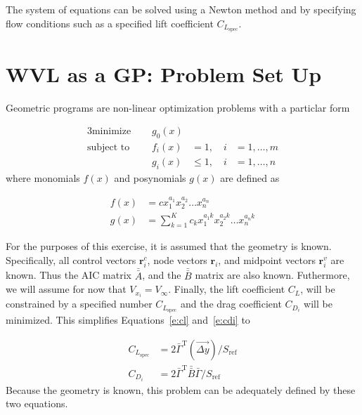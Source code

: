 \documentclass[10pt, a4paper]{article}
\begin{document}
The system of equations can be solved using a Newton method and by specifying flow conditions such as a specified lift coefficient $C_{L_{\mathrm{spec}}}$.


\section{WVL as a GP: Problem Set Up}

Geometric programs are non-linear optimization problems with a particlar form

\begin{alignat*}{3}
    \text{minimize }\quad & g_0 (x) && \\
    \text{subject to }\quad & f_i(x) &= 1,\quad  i&=1,\dots,m \\
                            & g_i(x) &\leq 1, \quad i&=1,\dots,n 
\end{alignat*}
where monomials $f(x)$ and posynomials $g(x)$ are defined as

\begin{align}
    f(x) &= cx_1^{a_1}x_2^{a_2}  \dots x_n^{a_n}  \\
    g(x) &= \sum_{k=1}^K c_k x_1^{a_1k}x_2^{a_2k}  \dots x_n^{a_nk}
\end{align}

For the purposes of this exercise, it is assumed that the geometry is known.  
Specifically, all control vectors $\mathbf{r}_i^c$, node vectors $\mathbf{r}_i$, and midpoint vectors $\mathbf{r}_i^v$ are known.  Thus the AIC matrix $\bar{\bar{A}}$, and the $\bar{\bar{B}}$ matrix are also known.  
Futhermore, we will assume for now that $V_{x_i} = V_{\infty}$.  
Finally, the lift coefficient $C_L$, will be constrained by a specified number $C_{L_{\mathrm{spec}}}$ and the drag coefficient $C_{D_i}$ will be minimized.
This simplifies Equations~\ref{e:cl} and~\ref{e:cdi} to 

\begin{align}
    \label{e:clsp}
    C_{L_{\mathrm{spec}}} &= 2 \bar{\Gamma}^{\mathrm{T}} (\vec{\Delta y})/S_{\mathrm{ref}} \\
    \label{e:cdsp}
    C_{D_i} &= 2 \bar{\Gamma}^{\mathrm{T}} \bar{\bar{B}} \bar{\Gamma}/S_{\mathrm{ref}} 
\end{align}
Because the geometry is known, this problem can be adequately defined by these two equations. 
\end{document}
